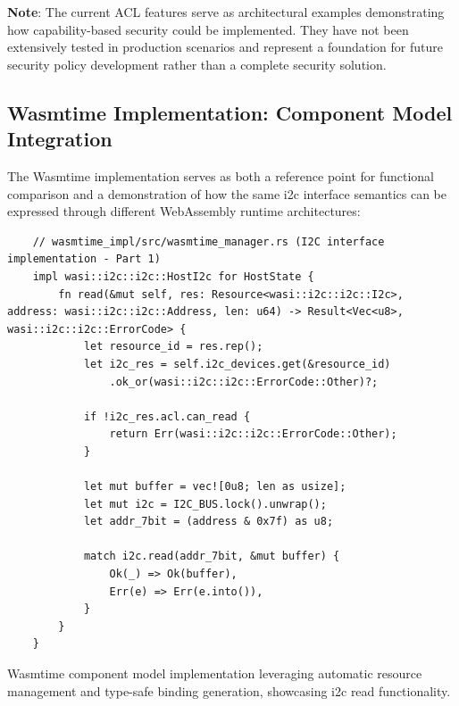 \textbf{Note}: The current ACL features serve as architectural examples demonstrating how capability-based security could be implemented. They have not been extensively tested in production scenarios and represent a foundation for future security policy development rather than a complete security solution.

\subsection{Wasmtime Implementation: Component Model Integration}

The Wasmtime implementation serves as both a reference point for functional comparison and a demonstration of how the same \acrshort{i2c} interface semantics can be expressed through different WebAssembly runtime architectures:

\begin{listing}[H]
    \begin{verbatim}
    // wasmtime_impl/src/wasmtime_manager.rs (I2C interface implementation - Part 1)
    impl wasi::i2c::i2c::HostI2c for HostState {
        fn read(&mut self, res: Resource<wasi::i2c::i2c::I2c>, address: wasi::i2c::i2c::Address, len: u64) -> Result<Vec<u8>, wasi::i2c::i2c::ErrorCode> {
            let resource_id = res.rep();
            let i2c_res = self.i2c_devices.get(&resource_id)
                .ok_or(wasi::i2c::i2c::ErrorCode::Other)?;
    
            if !i2c_res.acl.can_read {
                return Err(wasi::i2c::i2c::ErrorCode::Other);
            }
    
            let mut buffer = vec![0u8; len as usize];
            let mut i2c = I2C_BUS.lock().unwrap();
            let addr_7bit = (address & 0x7f) as u8;
    
            match i2c.read(addr_7bit, &mut buffer) {
                Ok(_) => Ok(buffer),
                Err(e) => Err(e.into()),
            }
        }
    }
    \end{verbatim}
    \caption{Wasmtime component model implementation leveraging automatic resource management and type-safe binding generation, showcasing \acrshort{i2c} read functionality.}
    \label{lst:wasmtime-implementation}
\end{listing}


